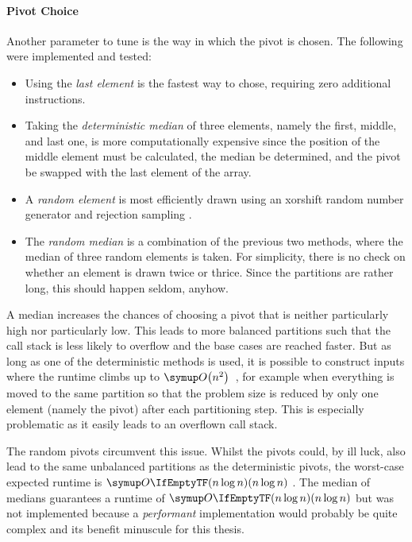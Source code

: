\paragraph{Pivot Choice}
Another parameter to tune is the way in which the pivot is chosen.
The following were implemented and tested:
\begin{itemize}
	\item
	Using the \emph{last element} is the fastest way to chose, requiring zero additional instructions.

	\item
	Taking the \emph{deterministic median} of three elements, namely the first, middle, and last one, is more computationally expensive since the position of the middle element must be calculated, the median be determined, and the pivot be swapped with the last element of the array.

	\item
	A \emph{random element} is most efficiently drawn using an xorshift random number generator and rejection sampling \cite{lukas_geis}.

	\item
	The \emph{random median} is a combination of the previous two methods, where the median of three random elements is taken.
	For simplicity, there is no check on whether an element is drawn twice or thrice.
	Since the partitions are rather long, this should happen seldom, anyhow.
\end{itemize}
A median increases the chances of choosing a pivot that is neither particularly high nor particularly low.
This leads to more balanced partitions such that the call stack is less likely to overflow and the base cases are reached faster.
But as long as one of the deterministic methods is used, it is possible to construct inputs where the runtime climbs up to \(\bigoh*{n^2}\)~\cite{erkiö1984worstcase}, for example when everything is moved to the same partition so that the problem size is reduced by only one element (namely the pivot) after each partitioning step.
This is especially problematic as it easily leads to an overflown call stack.

The random pivots circumvent this issue.
Whilst the pivots could, by ill luck, also lead to the same unbalanced partitions as the deterministic pivots, the worst-case expected runtime is \(\bigoh{n \log n}\) \cite{blum2011probabilistic}.
The median of medians \cite{blum1973median} guarantees a runtime of \(\bigoh{n \log n}\) but was not implemented because a \emph{performant} implementation would probably be quite complex and its benefit minuscule for this thesis.




